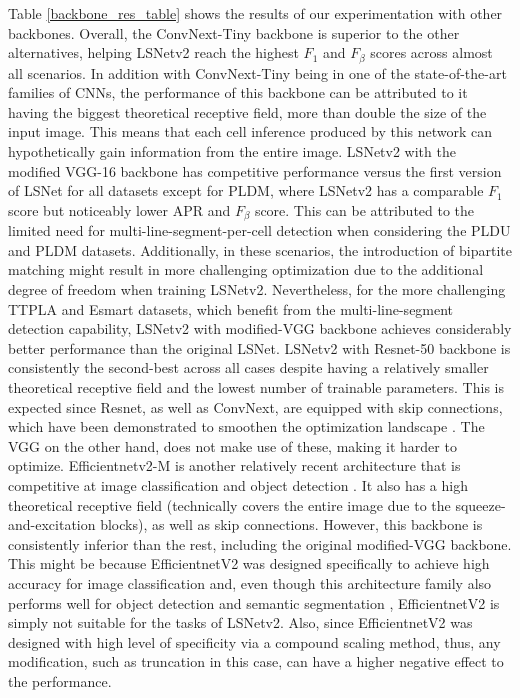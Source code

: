 \documentclass[journal]{IEEEtran}
\begin{document}
Table \ref{backbone_res_table} shows the results of our experimentation with other backbones. Overall, the ConvNext-Tiny backbone is superior to the other alternatives, helping LSNetv2 reach the highest $F_1$ and $F_\beta$ scores across almost all scenarios. In addition with ConvNext-Tiny being in one of the state-of-the-art families of CNNs, the performance of this backbone can be attributed to it having the biggest theoretical receptive field, more than double the size of the input image. This means that each cell inference produced by this network can hypothetically gain information from the entire image.  LSNetv2 with the modified VGG-16 backbone has competitive performance versus the first version of LSNet for all datasets except for PLDM, where LSNetv2 has a comparable $F_1$ score but noticeably lower APR and $F_{\beta}$ score. This can be attributed to the limited need for multi-line-segment-per-cell detection when considering the PLDU and PLDM datasets. Additionally, in these scenarios, the introduction of bipartite matching might result in more challenging optimization due to the additional degree of freedom when training LSNetv2. %
Nevertheless, for the more challenging TTPLA and Esmart datasets, which benefit from the multi-line-segment detection capability, LSNetv2 with modified-VGG backbone achieves considerably better performance than the original LSNet. LSNetv2 with Resnet-50 backbone is consistently the second-best across all cases despite having a relatively smaller theoretical receptive field and the lowest number of trainable parameters. This is expected since Resnet, as well as ConvNext, are equipped with skip connections, which have been demonstrated to smoothen the optimization landscape \cite{li2018visualizing}. The VGG on the other hand, does not make use of these, making it harder to optimize. Efficientnetv2-M is another relatively recent architecture that is competitive at image classification \cite{efficientnetv2} and object detection \cite{efficientdet}. It also has a high theoretical receptive field (technically covers the entire image due to the squeeze-and-excitation blocks), as well as skip connections. However, this backbone is consistently inferior than the rest, including the original modified-VGG backbone. This might be because EfficientnetV2 was designed specifically to achieve high accuracy for image classification and, even though this architecture family also performs well for object detection and semantic segmentation \cite{efficientnetv2}, EfficientnetV2 is simply not suitable for the tasks of LSNetv2. Also, since EfficientnetV2 was designed with high level of specificity via a compound scaling method, thus, any modification, such as truncation in this case, can have a higher negative effect to the performance.%
\end{document}
